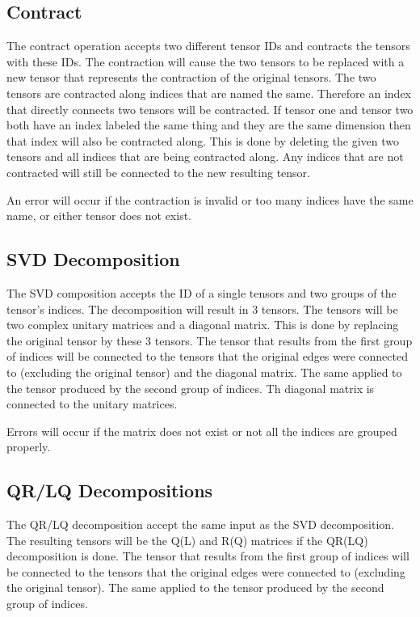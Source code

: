 \documentclass{juliacon}
\begin{document}
\begin{appendix}
\subsection{Contract}
The contract operation accepts two different tensor IDs and contracts the tensors with these IDs. The contraction will cause the two tensors to be replaced with a new tensor that represents the contraction of the original tensors. The two tensors are contracted along indices that are named the same. Therefore an index that directly connects two tensors will be contracted. 
If tensor one and tensor two both have an index labeled the same thing and they are the same dimension then that index will also be contracted along. This is done by deleting the given two tensors and all indices that are being contracted along. Any indices that are not contracted will still be connected to the new resulting tensor.

An error will occur if the contraction is invalid or too many indices have the same name, or either tensor does not exist.

\subsection{SVD Decomposition}
The SVD composition accepts the ID of a single tensors and two groups of the tensor's indices. The decomposition will result in 3 tensors. The tensors will be two complex unitary matrices and a diagonal matrix. This is done by replacing the original tensor by these 3 tensors. The tensor that results from the first group of indices will be connected to the tensors that the original edges were connected to (excluding the original tensor) and the diagonal matrix. The same applied to the tensor produced by the second group of indices. Th diagonal matrix is connected to the unitary matrices.

Errors will occur if the matrix does not exist or not all the indices are grouped properly.


\subsection{QR/LQ Decompositions}
The QR/LQ decomposition accept the same input as the SVD decomposition. The resulting tensors will be the Q(L) and R(Q) matrices if the QR(LQ) decomposition is done.  The tensor that results from the first group of indices will be connected to the tensors that the original edges were connected to (excluding the original tensor). The same applied to the tensor produced by the second group of indices.


\end{appendix}
\end{document}
